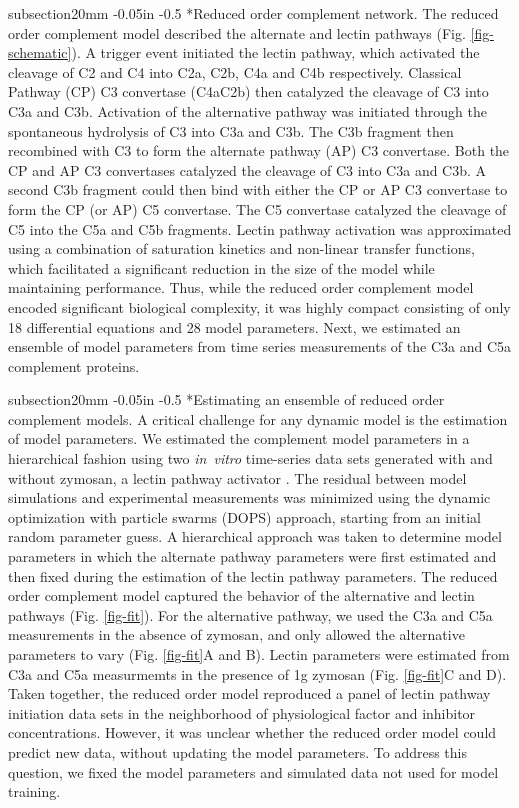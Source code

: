 \documentclass[12pt]{article}
\makeatletter
\renewcommand\subsection{\@startsection
	{subsection}{2}{0mm}
	{-0.05in}
	{-0.5\baselineskip}
	{\normalfont\normalsize\bfseries}}
\makeatother
\begin{document}
\subsection*{Reduced order complement network.}
The reduced order complement model described the alternate and lectin pathways (Fig. \ref{fig-schematic}).
A trigger event initiated the lectin pathway, which activated the cleavage of C2 and C4 into C2a, C2b, C4a and C4b respectively.
Classical Pathway (CP) C3 convertase (C4aC2b) then catalyzed the cleavage of C3 into C3a and C3b.
Activation of the alternative pathway was initiated through the spontaneous hydrolysis of C3 into C3a and C3b.
The C3b fragment then recombined with C3 to form the alternate pathway (AP) C3 convertase.
Both the CP and AP C3 convertases catalyzed the cleavage of C3 into C3a and C3b.
A second C3b fragment could then bind with either the CP or AP C3 convertase to form the CP (or AP) C5 convertase.
The C5 convertase catalyzed the cleavage of C5 into the C5a and C5b fragments.
Lectin pathway activation was approximated using a combination of saturation kinetics and non-linear transfer functions, which facilitated a significant reduction in the size of the model while maintaining performance.
Thus, while the reduced order complement model encoded significant biological complexity, it was highly compact consisting of only 18 differential equations and 28 model parameters.
Next, we estimated an ensemble of model parameters from time series measurements of the C3a and C5a complement proteins.

\subsection*{Estimating an ensemble of reduced order complement models.}
A critical challenge for any dynamic model is the estimation of model parameters.
We estimated the complement model parameters in a hierarchical fashion using two \textit{in~vitro} time-series data sets generated with and without zymosan, a lectin pathway activator \cite{morad2015time}.
The residual between model simulations and experimental measurements was minimized using the dynamic optimization with particle swarms (DOPS) approach,
starting from an initial random parameter guess.
A hierarchical approach was taken to determine model parameters in which the alternate pathway parameters were first estimated and then fixed during the estimation of the lectin pathway parameters.
The reduced order complement model captured the behavior of the alternative and lectin pathways (Fig. \ref{fig-fit}).
For the alternative pathway, we used the C3a and C5a measurements in the absence of zymosan, and only allowed the alternative parameters to vary (Fig. \ref{fig-fit}A and B).
Lectin parameters were estimated from C3a and C5a measurmemts in the presence of 1g zymosan (Fig. \ref{fig-fit}C and D).
Taken together, the reduced order model reproduced a panel of lectin pathway initiation data sets in the neighborhood of physiological factor and inhibitor concentrations.
However, it was unclear whether the reduced order model could predict new data, without updating the model parameters.
To address this question, we fixed the model parameters and simulated data not used for model training.
\end{document}
